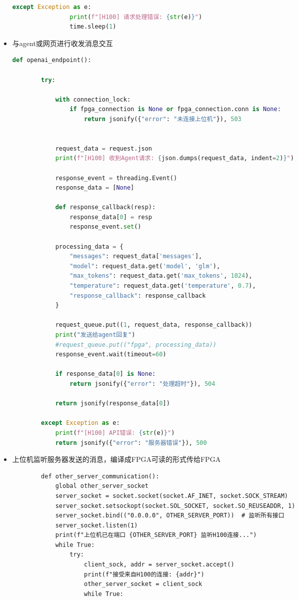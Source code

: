 \documentclass[AutoFakeBold,AutoFakeSlant,language=chinese,degree=bachelor]{sustechthesis}
\begin{document}
\begin{itemize}
\begin{lstlisting}[language=python]
            except Exception as e:
                print(f"[H100] 请求处理错误: {str(e)}")
                time.sleep(1)
        \end{lstlisting}
        \item 与agent或网页进行收发消息交互
        \begin{lstlisting}[language=python]
        def openai_endpoint():
        
        try:
            
            with connection_lock:
                if fpga_connection is None or fpga_connection.conn is None:
                    return jsonify({"error": "未连接上位机"}), 503
            
            
            request_data = request.json
            print(f"[H100] 收到Agent请求: {json.dumps(request_data, indent=2)}")
    
            response_event = threading.Event()
            response_data = [None]
            
            def response_callback(resp):
                response_data[0] = resp
                response_event.set()
    
            processing_data = {
                "messages": request_data['messages'],
                "model": request_data.get('model', 'glm'),
                "max_tokens": request_data.get('max_tokens', 1024),
                "temperature": request_data.get('temperature', 0.7),
                "response_callback": response_callback
            }
    
            request_queue.put((1, request_data, response_callback))
            print("发送给agent回复")
            #request_queue.put(("fpga", processing_data))
            response_event.wait(timeout=60)
            
            if response_data[0] is None:
                return jsonify({"error": "处理超时"}), 504
            
            return jsonify(response_data[0])
        
        except Exception as e:
            print(f"[H100] API错误: {str(e)}")
            return jsonify({"error": "服务器错误"}), 500
        \end{lstlisting}
        \item 上位机监听服务器发送的消息，编译成FPGA可读的形式传给FPGA
        \begin{lstlisting}
        def other_server_communication():
            global other_server_socket
            server_socket = socket.socket(socket.AF_INET, socket.SOCK_STREAM)
            server_socket.setsockopt(socket.SOL_SOCKET, socket.SO_REUSEADDR, 1)
            server_socket.bind(("0.0.0.0", OTHER_SERVER_PORT))  # 监听所有接口
            server_socket.listen(1)
            print(f"上位机已在端口 {OTHER_SERVER_PORT} 监听H100连接...")
            while True:
                try:
                    client_sock, addr = server_socket.accept()
                    print(f"接受来自H100的连接: {addr}")
                    other_server_socket = client_sock
                    while True:
        

\end{lstlisting}
\end{itemize}
\end{document}
